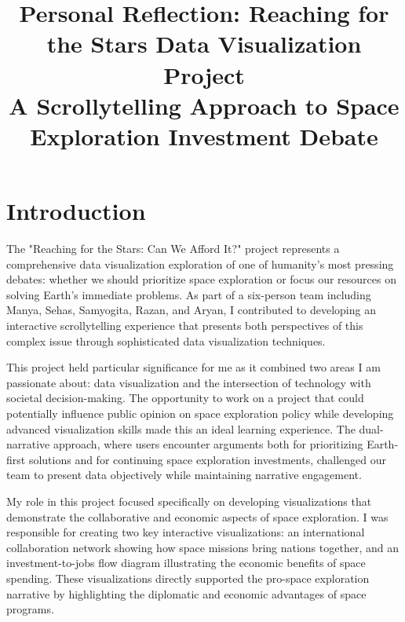 \documentclass[conference]{IEEEtran}
\begin{document}
\title{Personal Reflection: Reaching for the Stars Data Visualization Project\\
{\footnotesize A Scrollytelling Approach to Space Exploration Investment Debate}}

\author{
}

\maketitle

\section{Introduction}

The "Reaching for the Stars: Can We Afford It?" project represents a comprehensive data visualization exploration of one of humanity's most pressing debates: whether we should prioritize space exploration or focus our resources on solving Earth's immediate problems. As part of a six-person team including Manya, Sehas, Samyogita, Razan, and Aryan, I contributed to developing an interactive scrollytelling experience that presents both perspectives of this complex issue through sophisticated data visualization techniques.

This project held particular significance for me as it combined two areas I am passionate about: data visualization and the intersection of technology with societal decision-making. The opportunity to work on a project that could potentially influence public opinion on space exploration policy while developing advanced visualization skills made this an ideal learning experience. The dual-narrative approach, where users encounter arguments both for prioritizing Earth-first solutions and for continuing space exploration investments, challenged our team to present data objectively while maintaining narrative engagement.

My role in this project focused specifically on developing visualizations that demonstrate the collaborative and economic aspects of space exploration. I was responsible for creating two key interactive visualizations: an international collaboration network showing how space missions bring nations together, and an investment-to-jobs flow diagram illustrating the economic benefits of space spending. These visualizations directly supported the pro-space exploration narrative by highlighting the diplomatic and economic advantages of space programs.
\end{document}
